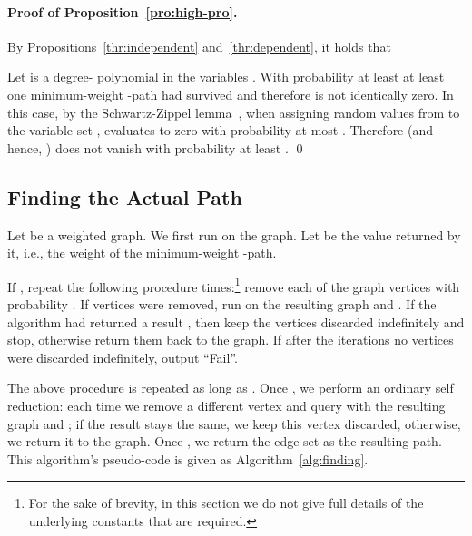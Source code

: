 \documentclass{llncs}
\begin{document}
\paragraph{Proof of Proposition~\ref{pro:high-pro}.}
By Propositions~\ref{thr:independent} and~\ref{thr:dependent}, it holds that 

Let 
 is a degree- polynomial in the variables . With probability at least  at least one minimum-weight -path  had survived and therefore  is not identically zero. In this case, by the Schwartz-Zippel lemma~\cite{Schwartz80,Zippel79,DL78}, when assigning random values from  to the variable set ,  evaluates to zero with probability at most . Therefore  (and hence, ) does not vanish with probability at least .
\qed


\subsection{Finding the Actual Path}\label{sec:actual:app}
Let  be a weighted graph. We first run  on the graph. Let  be the value returned by it, i.e., the weight of the minimum-weight -path. 

If , repeat the following procedure  times:\footnote{For the sake of brevity, in this section we do not give full details of the underlying constants that are required.} remove each of the graph vertices with probability . If  vertices were removed, run  on the resulting graph and . If the algorithm had returned a result , then keep the vertices discarded indefinitely and stop, otherwise return them back to the graph. If after the  iterations no vertices were discarded indefinitely, output ``Fail''. 

The above procedure is repeated as long as . Once , we perform an ordinary self reduction: each time we remove a different vertex and query  with the resulting graph and ; if the result stays the same, we keep this vertex discarded, otherwise, we return it to the graph. Once , we return the edge-set  as the resulting path. This algorithm's pseudo-code is given as Algorithm~\ref{alg:finding}.
\end{document}
